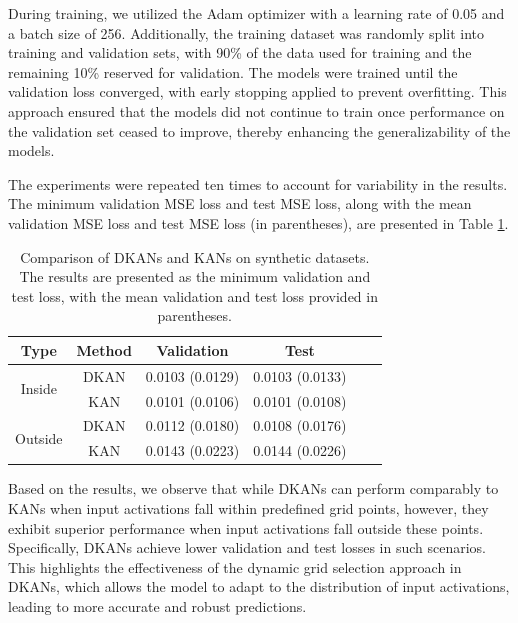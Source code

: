 \documentclass[11pt]{scrartcl}
\begin{document}
During training, we utilized the Adam optimizer with a learning rate of 0.05 and a batch size of 256. Additionally, the training dataset was randomly split into training and validation sets, with 90\% of the data used for training and the remaining 10\% reserved for validation.
The models were trained until the validation loss converged, with early stopping applied to prevent overfitting. This approach ensured that the models did not continue to train once performance on the validation set ceased to improve, thereby enhancing the generalizability of the models.

The experiments were repeated ten times to account for variability in the results. The minimum validation MSE loss and test MSE loss, along with the mean validation MSE loss and test MSE loss (in parentheses), are presented in Table \ref{tab:synthetic-dataset}.

\begin{table}[htbp]
	\centering
	\caption{Comparison of DKANs and KANs on synthetic datasets. The results are presented as the minimum validation and test loss, with the mean validation and test loss provided in parentheses.}
	\label{tab:synthetic-dataset}
	\begin{tabular}{cccccc}
		\toprule
		Type                     & Method & Validation      & Test            \\
		\midrule
		\multirow{2}{*}{Inside}  & DKAN   & 0.0103 (0.0129) & 0.0103 (0.0133) \\
		                         & KAN    & 0.0101 (0.0106) & 0.0101 (0.0108) \\
		\midrule
		\multirow{2}{*}{Outside} & DKAN   & 0.0112 (0.0180) & 0.0108 (0.0176) \\
		                         & KAN    & 0.0143 (0.0223) & 0.0144 (0.0226) \\
		\bottomrule
	\end{tabular}
\end{table}

Based on the results, we observe that while DKANs can perform comparably to KANs when input activations fall within predefined grid points, however, they exhibit superior performance when input activations fall outside these points. Specifically, DKANs achieve lower validation and test losses in such scenarios. This highlights the effectiveness of the dynamic grid selection approach in DKANs, which allows the model to adapt to the distribution of input activations, leading to more accurate and robust predictions.
\end{document}
